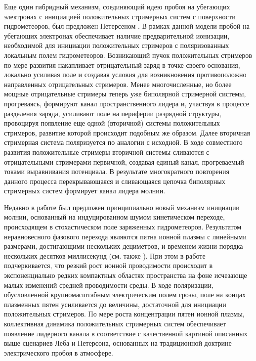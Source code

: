 Еще один гибридный механизм, соединяющий идею пробоя на убегающих электронах с инициацией положительных стримерных систем с поверхности гидрометеоров, был предложен Петерсеном \cite{Petersen2008}. В рамках данной модели пробой на убегающих электронах обеспечивает наличие предварительной ионизации, необходимой для инициации положительных стримеров с поляризованных локальным полем гидрометеоров. Возникающий пучок положительных стримеров по мере развития накапливает отрицательный заряд в точке своего основания, локально усиливая поле и создавая условия для возникновения противоположно направленных отрицательных стримеров. Менее многочисленные, но более мощные отрицательные стримеры теперь уже биполярной стримерной системы, прогреваясь, формируют канал пространственного лидера и, участвуя в процессе разделения заряда, усиливают поле на периферии разрядной структуры, провоцируя появление еще одной (вторичной) системы положительных стримеров, развитие которой происходит подобным же образом. Далее вторичная стримерная система поляризуется по аналогии с исходной. В ходе совместного развития положительные стримеры вторичной системы сливаются с отрицательными стримерами первичной, создавая единый канал, прогреваемый токами выравнивания потенциала. В результате многократного повторения данного процесса перекрывающаяся и сливающаяся цепочка биполярных стримерных систем формирует канал лидера молнии.


Недавно в работе \cite{Iudin2017} был предложен принципиально новый механизм инициации молнии, основанный на индуцированном шумом кинетическом переходе, происходящем в стохастическом поле заряженных гидрометеоров. Результатом неравновесного фазового перехода являются пятна ионной плазмы с линейными размерами, достигающими нескольких дециметров, и временем жизни порядка нескольких десятков миллисекунд (см. также \cite{todo}). При этом в работе \cite{Iudin2017} подчеркивается, что резкий рост ионной проводимости происходит в экспоненциально редких компактных областях пространства на фоне исчезающе малых изменений средней проводимости среды. В ходе поляризации, обусловленной крупномасштабным электрическим полем грозы, поле на концах плазменных пятен усиливается до величины, достаточной для инициации положительных стримеров. По мере роста концентрации пятен ионной плазмы, коллективная динамика положительных стримерных систем обеспечивает появление лидерного канала в соответствие с качественной картиной описанных выше сценариев Леба и Петерсона, основанных на традиционной доктрине электрического пробоя в атмосфере.

